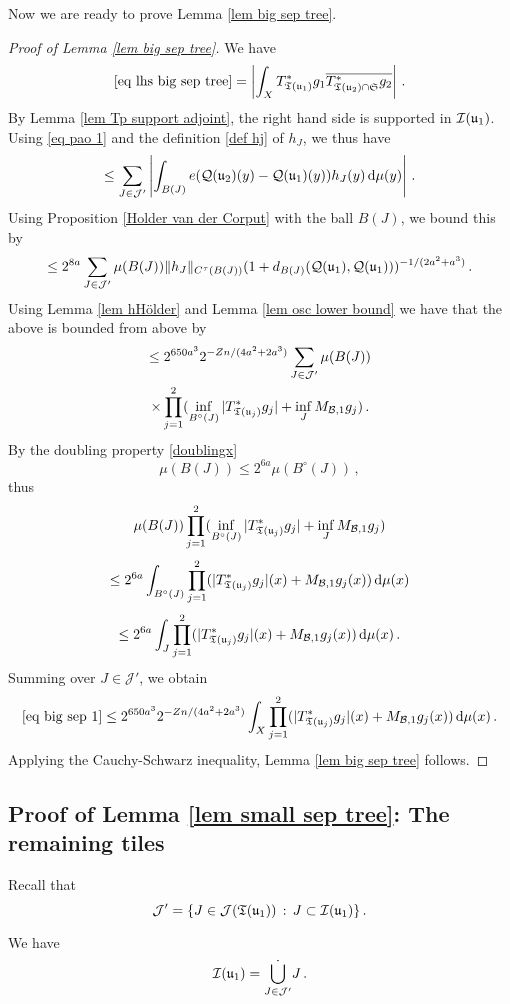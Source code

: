 {    Now we are ready to prove Lemma \ref{lem big sep tree}.
    \begin{proof}[Proof of Lemma \ref{lem big sep tree}]
    We have
    $$
        \eqref{eq lhs big sep tree} = \left| \int_{X} T_{\mathfrak T(\mathfrak u_1)}^* g_1 \overline{T_{\mathfrak T(\mathfrak u_2) \cap \mathfrak{S}}^* g_2 }\right|\,.
    $$
    By Lemma \ref{lem Tp support adjoint}, the right hand side is supported in $\mathcal{I}(\mathfrak u_1)$. Using \eqref{eq pao 1} and the definition \eqref{def hj} of $h_J$, we thus have
    $$
        \le  \sum_{J \in \mathcal{J}'} \left|\int_{B(J)} e(\mathcal{Q}(\mathfrak u_2)(y) - \mathcal{Q}(\mathfrak u_1)(y)) h_J(y) \, \mathrm{d}\mu(y) \right|\,.
    $$
    Using Proposition \ref{Holder van der Corput} with the ball $B(J)$, we bound this by
    $$
        \le 2^{8a} \sum_{J \in \mathcal{J}'} \mu(B(J)) \|h_J\|_{C^{\tau}(B(J))} (1 + d_{B(J)}(\mathcal{Q}(\mathfrak u_1), \mathcal{Q}(\mathfrak u_1)))^{-1/(2a^2+a^3)}\,.
    $$
    Using Lemma \ref{lem hHölder} and Lemma \ref{lem osc lower bound} we have that the above is bounded from above by
    \begin{multline}
        \label{eq big sep 1}
        \le 2^{650a^3} 2^{-Zn/(4a^2 + 2a^3)} \sum_{J \in \mathcal{J}'} \mu(B(J)) \\
        \times \prod_{j=1}^2 (\inf_{B^\circ{}(J)} |T_{\mathfrak T(\mathfrak u_j)}^* g_j| + \inf_J M_{\mathcal{B},1} g_j)\,.
    \end{multline}
    By the doubling property \eqref{doublingx}
    $$
        \mu(B(J)) \le 2^{6a} \mu(B^\circ{}(J))\,,
    $$
    thus
    $$
        \mu(B(J)) \prod_{j=1}^2 (\inf_{B^\circ{}(J)} |T_{\mathfrak T(\mathfrak u_j)}^* g_j| + \inf_J M_{\mathcal{B},1} g_j)
    $$
    $$
        \le 2^{6a} \int_{B^\circ{}(J)} \prod_{j=1}^2 ( |T_{\mathfrak T(\mathfrak u_j)}^* g_j|(x) +  M_{\mathcal{B},1} g_j(x)) \, \mathrm{d}\mu(x)
    $$
    $$
        \le 2^{6a} \int_J \prod_{j=1}^2 ( |T_{\mathfrak T(\mathfrak u_j)}^* g_j|(x) +  M_{\mathcal{B},1} g_j(x)) \, \mathrm{d}\mu(x)\,.
    $$
    Summing over $J \in \mathcal{J}'$, we obtain
    $$
        \eqref{eq big sep 1} \le 2^{650a^3} 2^{-Zn/(4a^2 + 2a^3)} \int_X \prod_{j=1}^2 ( |T_{\mathfrak T(\mathfrak u_j)}^* g_j|(x) +  M_{\mathcal{B},1} g_j(x)) \, \mathrm{d}\mu(x)\,.
    $$
    Applying the Cauchy-Schwarz inequality, Lemma \ref{lem big sep tree} follows.
    \end{proof}

\subsection{Proof of Lemma \ref{lem small sep tree}: The remaining tiles}
    \label{subsec rest tiles}
    Recall that
    $$
        \mathcal{J}' = \{J \in \mathcal{J}(\mathfrak T(\mathfrak u_1)) \, : \, J \subset \mathcal{I}(\mathfrak u_1)\}\,.
    $$
    \begin{lemma}
        \label{lem J' partition 2}
        We have
        $$
            \mathcal{I}(\mathfrak u_1) = \dot{\bigcup_{J \in \mathcal{J}'}} J\,.
        $$
    \end{lemma}

}
